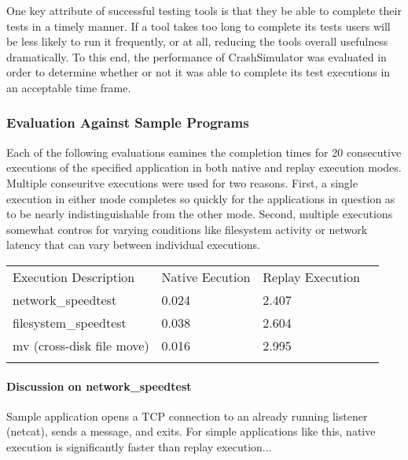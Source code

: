         One key attribute of successful testing tools is that they be able to complete their tests in a timely manner.
        If a tool takes too long to complete its tests users will be less likely to run it frequently, or at all,
        reducing the tools overall usefulness dramatically. To this end, the performance of CrashSimulator was evaluated
        in order to determine whether or not it was able to complete its test executions in an acceptable time frame.

        \subsubsection{Evaluation Against Sample Programs}

        Each of the following evaluations eamines the completion times for 20 consecutive executions of the specified
        application in both native and replay execution modes.  Multiple conseuritve executions were used for two
        reasons.  First, a single execution in either mode completes so quickly for the applications in question as to
        be nearly indistinguishable from the other mode.  Second, multiple executions somewhat contros for varying
        conditions like filesystem activity or network latency that can vary between individual executions.

            \begin{table}[H]
                \scriptsize{}
                \begin{tabular}{l  l  l  l}
                    \toprule{}
                        Execution Description & Native Eecution & Replay Execution\\
                        network\_speedtest & 0.024 & 2.407 \\
                        filesystem\_speedtest & 0.038 & 2.604 \\
                        mv (cross-disk file move) & 0.016 & 2.995 \\
                    \bottomrule{}
                \end{tabular}
            \end{table}

        \paragraph{Discussion on network\_speedtest}

        Sample application opens a TCP connection to an already running listener (netcat), sends a message, and
        exits. For simple applications like this, native execution is significantly faster than replay execution...

